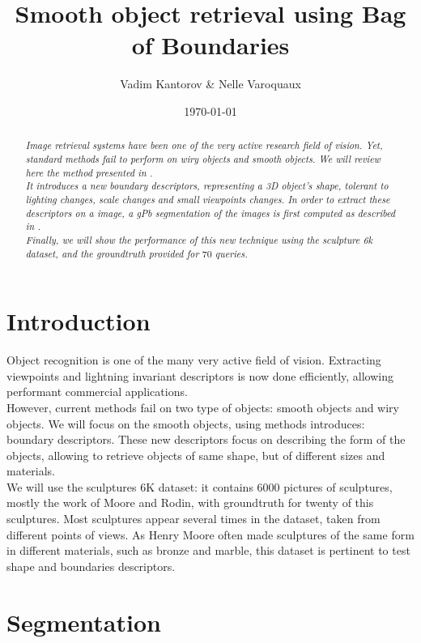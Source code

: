 \documentclass{article}
\date{\today}
\title{Smooth object retrieval using Bag of Boundaries}
\author{Vadim Kantorov \& Nelle Varoquaux}
\begin{document}
\maketitle
\begin{abstract}
\textit{Image retrieval systems have been one of the very active research
field of vision. Yet, standard methods fail to perform on wiry objects and
smooth objects. We will review here the method presented in
\cite{Arandjelovic11}.\\
It introduces a new boundary descriptors, representing a 3D object's shape,
tolerant to lighting changes, scale changes and small viewpoints changes. In
order to extract these descriptors on a image, a gPb segmentation of the images
is first computed as described in \cite{gpb}.\\
Finally, we will show the performance of this new technique using the
sculpture 6k dataset, and the groundtruth provided for $70$ queries.}
\end{abstract}

\section{Introduction}
Object recognition is one of the many very active field of vision. Extracting
viewpoints and lightning invariant descriptors is now done efficiently,
allowing performant commercial applications. \\
However, current methods fail on two type of objects: smooth objects and wiry
objects. We will focus on the smooth objects, using methods
\cite{Arandjelovic11} introduces: boundary descriptors. These new descriptors
focus on describing the form of the objects, allowing to retrieve objects
of same shape, but of different sizes and materials. \\
We will use the sculptures 6K dataset: it contains $6000$ pictures of
sculptures, mostly the work of Moore and Rodin, with groundtruth for twenty
of this sculptures. Most sculptures appear several times in the dataset, taken
from different points of views. As Henry Moore often made sculptures of the
same form in different materials, such as bronze and marble, this dataset is
pertinent to test shape and boundaries descriptors.

\section{Segmentation}
\end{document}
